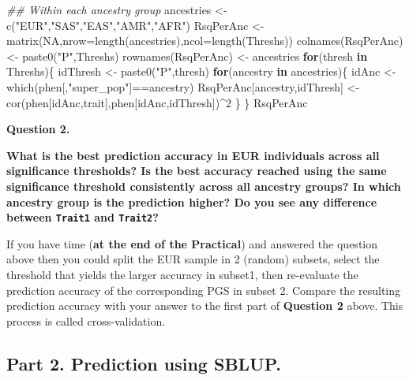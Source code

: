 \documentclass[
  letterpaper,
  DIV=11,
  numbers=noendperiod]{scrartcl}
\newenvironment{Shaded}{\begin{snugshade}}{\end{snugshade}}
\newcommand{\AttributeTok}[1]{\textcolor[rgb]{0.40,0.45,0.13}{#1}}
\newcommand{\ConstantTok}[1]{\textcolor[rgb]{0.56,0.35,0.01}{#1}}
\newcommand{\ControlFlowTok}[1]{\textcolor[rgb]{0.00,0.23,0.31}{\textbf{#1}}}
\newcommand{\DecValTok}[1]{\textcolor[rgb]{0.68,0.00,0.00}{#1}}
\newcommand{\DocumentationTok}[1]{\textcolor[rgb]{0.37,0.37,0.37}{\textit{#1}}}
\newcommand{\FunctionTok}[1]{\textcolor[rgb]{0.28,0.35,0.67}{#1}}
\newcommand{\NormalTok}[1]{\textcolor[rgb]{0.00,0.23,0.31}{#1}}
\newcommand{\OtherTok}[1]{\textcolor[rgb]{0.00,0.23,0.31}{#1}}
\newcommand{\SpecialCharTok}[1]{\textcolor[rgb]{0.37,0.37,0.37}{#1}}
\newcommand{\StringTok}[1]{\textcolor[rgb]{0.13,0.47,0.30}{#1}}
\begin{document}
\begin{Shaded}
\begin{Highlighting}[]
\DocumentationTok{\#\# Within each ancestry group}
\NormalTok{ancestries }\OtherTok{\textless{}{-}} \FunctionTok{c}\NormalTok{(}\StringTok{"EUR"}\NormalTok{,}\StringTok{"SAS"}\NormalTok{,}\StringTok{"EAS"}\NormalTok{,}\StringTok{"AMR"}\NormalTok{,}\StringTok{"AFR"}\NormalTok{)}
\NormalTok{RsqPerAnc  }\OtherTok{\textless{}{-}} \FunctionTok{matrix}\NormalTok{(}\ConstantTok{NA}\NormalTok{,}\AttributeTok{nrow=}\FunctionTok{length}\NormalTok{(ancestries),}\AttributeTok{ncol=}\FunctionTok{length}\NormalTok{(Threshs))}
\FunctionTok{colnames}\NormalTok{(RsqPerAnc) }\OtherTok{\textless{}{-}} \FunctionTok{paste0}\NormalTok{(}\StringTok{"P"}\NormalTok{,Threshs)}
\FunctionTok{rownames}\NormalTok{(RsqPerAnc) }\OtherTok{\textless{}{-}}\NormalTok{ ancestries}
\ControlFlowTok{for}\NormalTok{(thresh }\ControlFlowTok{in}\NormalTok{ Threshs)\{}
\NormalTok{  idThresh }\OtherTok{\textless{}{-}} \FunctionTok{paste0}\NormalTok{(}\StringTok{"P"}\NormalTok{,thresh)}
  \ControlFlowTok{for}\NormalTok{(ancestry }\ControlFlowTok{in}\NormalTok{ ancestries)\{}
\NormalTok{    idAnc }\OtherTok{\textless{}{-}} \FunctionTok{which}\NormalTok{(phen[,}\StringTok{"super\_pop"}\NormalTok{]}\SpecialCharTok{==}\NormalTok{ancestry)}
\NormalTok{    RsqPerAnc[ancestry,idThresh] }\OtherTok{\textless{}{-}} \FunctionTok{cor}\NormalTok{(phen[idAnc,trait],phen[idAnc,idThresh])}\SpecialCharTok{\^{}}\DecValTok{2}
\NormalTok{  \}}
\NormalTok{\}}
\NormalTok{RsqPerAnc}
\end{Highlighting}
\end{Shaded}

\textbf{Question 2. }

\textbf{What is the best prediction accuracy in EUR individuals across
all significance thresholds? Is the best accuracy reached using the same
significance threshold consistently across all ancestry groups? In which
ancestry group is the prediction higher? Do you see any difference
between \texttt{Trait1} and \texttt{Trait2}?}

If you have time (\textbf{at the end of the Practical}) and answered the
question above then you could split the EUR sample in 2 (random)
subsets, select the threshold that yields the larger accuracy in
subset1, then re-evaluate the prediction accuracy of the corresponding
PGS in subset 2. Compare the resulting prediction accuracy with your
answer to the first part of \textbf{Question 2} above. This process is
called cross-validation.

\subsection{Part 2. Prediction using
SBLUP.}\label{part-2.-prediction-using-sblup.}
\end{document}
